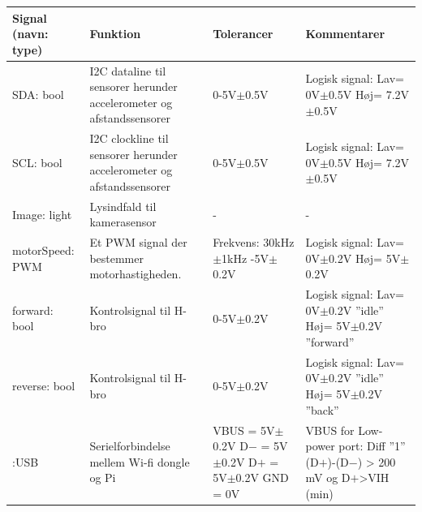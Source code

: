 \begin{table}[h]
	\centering
	\begin{tabularx}{\textwidth}{|l|X|X|X|} \hline
	\textbf{Signal (navn: type)} & \textbf{Funktion} & \textbf{Tolerancer} & \textbf{Kommentarer} \\ \hline
SDA: bool
	& I2C dataline til sensorer herunder accelerometer og afstandssensorer  
	& 0-5V$\pm$0.5V 
 	& Logisk signal: 			\newline
		Lav= 0V$\pm$0.5V  	\newline
		Høj= 7.2V$\pm$0.5V
	\\ \hline
	
SCL: bool
	& I2C clockline  til sensorer herunder accelerometer og afstandssensorer
	& 0-5V$\pm$0.5V
	& Logisk signal:			\newline 
		Lav= 0V$\pm$0.5V 	\newline
		Høj= 7.2V$\pm$0.5V
	\\ \hline
	
Image: light
	& Lysindfald til kamerasensor
	& -
	& -
	\\ \hline

motorSpeed: PWM	
	& Et PWM signal der bestemmer motorhastigheden.	
	& Frekvens: 30kHz$\pm$1kHz \newline
	  0-5V$\pm$0.2V	
	& Logisk signal: 			\newline 
		Lav= 0V$\pm$0.2V 	\newline
		Høj= 5V$\pm$0.2V
	\\ \hline
	
forward: bool	
	& Kontrolsignal til H-bro
	& 0-5V$\pm$0.2V
	& Logisk signal:					\newline 
		Lav= 0V$\pm$0.2V  ''idle''		\newline
		Høj= 5V$\pm$0.2V  ''forward''
	\\ \hline
	
reverse: bool	
	& Kontrolsignal til H-bro
	& 0-5V$\pm$0.2V	
	& Logisk signal: 					\newline
		Lav= 0V$\pm$0.2V ''idle''		\newline
		Høj= 5V$\pm$0.2V ''back''
	\\ \hline
	
:USB 	
	& Serielforbindelse mellem Wi-fi dongle og Pi	
	& VBUS = 5V$\pm$0.2V 				\newline 
	  D$-$ = 5V$\pm$0.2V					\newline
	  D$+$ = 5V$\pm$0.2V					\newline
	  GND = 0V							\newline	  
	  & VBUS for Low-power port: 		\newline
		Diff  ''1''						\newline
		(D$+$)-(D$-$) > 200 mV				\newline
		og D$+$>VIH (min)					\newline


\end{tabularx}
\end{table}
